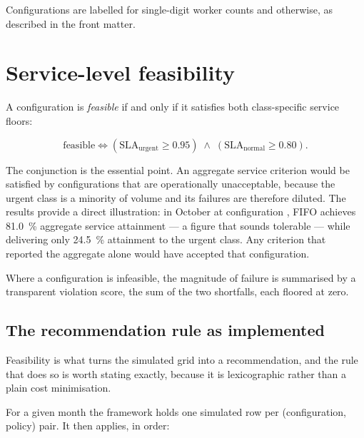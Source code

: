 Configurations are labelled  for single-digit worker counts and 
otherwise, as described in the front matter.

\section{Service-level feasibility}
\label{sec:feasibility}

A configuration is \emph{feasible} if and only if it satisfies both class-specific service
floors:

\begin{equation}
\text{feasible} \iff
\left(\text{SLA}_{\text{urgent}} \geq 0.95\right) \;\wedge\;
\left(\text{SLA}_{\text{normal}} \geq 0.80\right).
\label{eq:feasibility}
\end{equation}

The conjunction is the essential point. An aggregate service criterion would be satisfied by
configurations that are operationally unacceptable, because the urgent class is a minority of
volume and its failures are therefore diluted. The results provide a direct illustration: in
October at configuration , FIFO achieves \SI{81.0}{\percent} aggregate service
attainment --- a figure that sounds tolerable --- while delivering only \SI{24.5}{\percent}
attainment to the urgent class. Any criterion that reported the aggregate alone would have
accepted that configuration.

Where a configuration is infeasible, the magnitude of failure is summarised by a transparent
violation score, the sum of the two shortfalls, each floored at zero.

\subsection{The recommendation rule as implemented}
\label{sec:selection-rule}

Feasibility is what turns the simulated grid into a recommendation, and the rule that does so is
worth stating exactly, because it is lexicographic rather than a plain cost minimisation.

For a given month the framework holds one simulated row per (configuration, policy) pair. It
then applies, in order:

